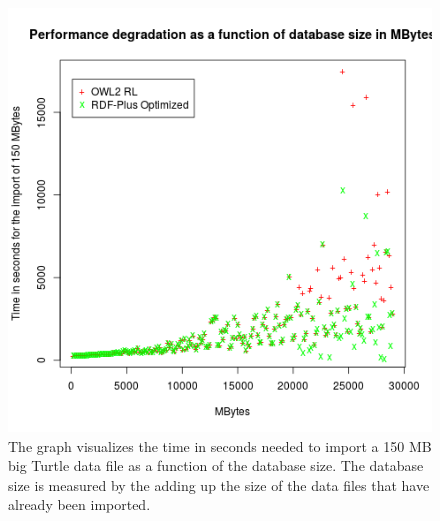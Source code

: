 \begin{figure}
\centering
\includegraphics[width=\textwidth]{Figures/performance-degradation-both}
\decoRule
\caption[Performance degradation]{The graph visualizes the time in seconds needed to import a 150 MB big Turtle data file as a function of the database size. The database size is measured by the adding up the size of the data files that have already been imported.}
\label{fig:performance-degradation}
\end{figure}

